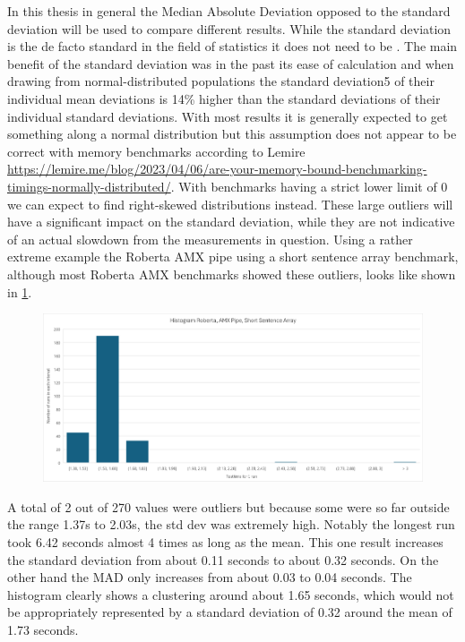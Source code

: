 In this thesis in general the Median Absolute Deviation opposed to the standard deviation will be used to compare different results. While the standard deviation is the de facto standard in the field of statistics it does not need to be \cite{Gorard}. The main benefit of the standard deviation was in the past its ease of calculation and when drawing from normal-distributed populations \guillemotright the standard deviation5 of their individual mean deviations is 14\% higher than the standard deviations of their individual standard deviations. \guillemotleft \cite{Gorard}
With most results it is generally expected to get something along a normal distribution but this assumption does not appear to be correct with memory benchmarks according to Lemire \url{https://lemire.me/blog/2023/04/06/are-your-memory-bound-benchmarking-timings-normally-distributed/}. With benchmarks having a strict lower limit of 0 we can expect to find right-skewed distributions instead. These large outliers will have a significant impact on the standard deviation, while they are not indicative of an actual slowdown from the measurements in question. Using a rather extreme example the Roberta AMX pipe using a short sentence array benchmark, although most Roberta AMX benchmarks showed these outliers, looks like shown in \cref{fig:histogramm}.
\begin{figure}
\centering
\includegraphics[width=\textwidth]{figures/Histogramm.png}
\caption{}
\label{fig:histogramm}
\end{figure}
A total of 2 out of 270 values were outliers but because some were so far outside the range 1.37s to 2.03s, the std dev was extremely high. Notably the longest run took 6.42 seconds almost 4 times as long as the mean. This one result increases the standard deviation from about 0.11 seconds to about 0.32 seconds. On the other hand the MAD only increases from about 0.03 to 0.04 seconds. The histogram clearly shows a clustering around about  1.65 seconds, which would not be appropriately represented by a standard deviation of 0.32 around the mean of 1.73 seconds.

